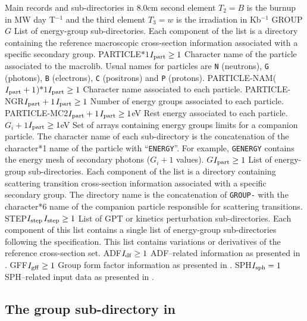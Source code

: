 \begin{DescriptionEnregistrement}{Main records and sub-directories in }{8.0cm}
{   second element $T_{2}=B$ is the burnup in MW day T$^{-1}$ and the third element $T_{3}=w$ is the 
   irradiation in Kb$^{-1}$}
\DirlEnr
  {GROUP}{$G$}
  {List of energy-group sub-directories. Each component of the list is a directory containing
  the reference macroscopic cross-section information associated with a specific secondary group.}
\OptCharEnr
  {PARTICLE}{$*1$}{$I_{\rm part}\ge 1$} 
  {Character name of the particle associated to the macrolib. Usual names for
  particles are {\tt N} (neutrons), {\tt G} (photons), {\tt B} (electrons),
  {\tt C} (positrons) and {\tt P} (protons).}
\OptCharEnr
  {PARTICLE-NAM}{($I_{\rm part}+1$)$*1$}{$I_{\rm part}\ge 1$} 
  {Character name associated to each particle.}
\OptIntEnr
  {PARTICLE-NGR}{$I_{\rm part}+1$}{$I_{\rm part}\ge 1$}
  {Number of energy groups associated to each particle.}
\OptRealEnr
  {PARTICLE-MC2}{$I_{\rm part}+1$}{$I_{\rm part}\ge 1$}{eV}
  {Rest energy associated to each particle.}
\OptRealVar
  {}{$G_i+1$}{$I_{\rm part}\ge 1$}{eV}
  {Set of arrays containing energy groups limits for a companion particle. The character name
  of each sub-directory is the concatenation of the character*1 name of the particle with ``{\tt ENERGY}''.
  For example, {\tt GENERGY} contains the energy mesh of secondary photons ($G_i+1$ values).}
\OptDirlVar
  {}{$G$}{$I_{\rm part}\ge 1$} 
  {List of energy-group sub-directories. Each component of the list is a directory containing
  scattering transition cross-section information associated with a specific secondary group.
  The directory  name is the concatenation of {\tt GROUP-} with the character*6
  name of the companion particle responsible for scattering transitions.}
\OptDirlEnr
  {STEP}{$I_{\rm step}$}{$I_{\rm step}\ge 1$} 
  {List of GPT or kinetics perturbation sub-directories. Each component of
  this list contains a single 
  list of energy-group sub-directories following the  specification.
  This  list contains variations or derivatives of the reference cross-section set.}
\OptDirEnr
  {ADF}{$I_{\rm df} \ge 1$}
  {ADF--related information as presented in .}
\OptDirEnr
  {GFF}{$I_{\rm gff} \ge 1$}
  {Group form factor information as presented in .}
\OptDirEnr
  {SPH}{$I_{\rm sph} = 1$}
  {SPH--related input data as presented in .}
\end{DescriptionEnregistrement}

\subsection{The group sub-directory  in }\label{sect:macrolibdirgroup}

